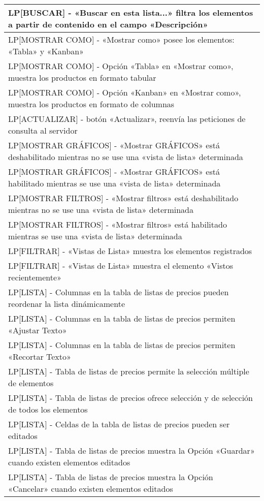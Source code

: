 \begin{longtable}{|p{15.0cm}|}
LP[BUSCAR] - «Buscar en esta lista...» filtra los elementos a partir de contenido en el campo «Descripción» \\ \hline
LP[MOSTRAR COMO] - «Mostrar como» posee los elementos: «Tabla» y «Kanban» \\ \hline
LP[MOSTRAR COMO] - Opción «Tabla» en «Mostrar como», muestra los productos en formato tabular \\ \hline
LP[MOSTRAR COMO] - Opción «Kanban» en «Mostrar como», muestra los productos en formato de columnas \\ \hline
LP[ACTUALIZAR] - botón «Actualizar», reenvía las peticiones de consulta al servidor \\ \hline
LP[MOSTRAR GRÁFICOS] - «Mostrar GRÁFICOS» está deshabilitado mientras no se use una «vista de lista» determinada \\ \hline
LP[MOSTRAR GRÁFICOS] - «Mostrar GRÁFICOS» está habilitado mientras se use una «vista de lista» determinada \\ \hline
LP[MOSTRAR FILTROS] - «Mostrar filtros» está deshabilitado mientras no se use una «vista de lista» determinada \\ \hline
LP[MOSTRAR FILTROS] - «Mostrar filtros» está habilitado mientras se use una «vista de lista» determinada \\ \hline
LP[FILTRAR] - «Vistas de Lista» muestra los elementos registrados \\ \hline
LP[FILTRAR] - «Vistas de Lista» muestra el elemento «Vistos recientemente» \\ \hline
LP[LISTA] - Columnas en la tabla de listas de precios pueden reordenar la lista dinámicamente \\ \hline
LP[LISTA] - Columnas en la tabla de listas de precios permiten «Ajustar Texto» \\ \hline
LP[LISTA] - Columnas en la tabla de listas de precios permiten «Recortar Texto» \\ \hline
LP[LISTA] - Tabla de listas de precios permite la selección múltiple de elementos \\ \hline
LP[LISTA] - Tabla de listas de precios ofrece selección y de selección de todos los elementos \\ \hline
LP[LISTA] - Celdas de la tabla de listas de precios pueden ser editados \\ \hline
LP[LISTA] - Tabla de listas de precios muestra la Opción «Guardar» cuando existen elementos editados \\ \hline
LP[LISTA] - Tabla de listas de precios muestra la Opción «Cancelar» cuando existen elementos editados \\ \hline

\end{longtable}
